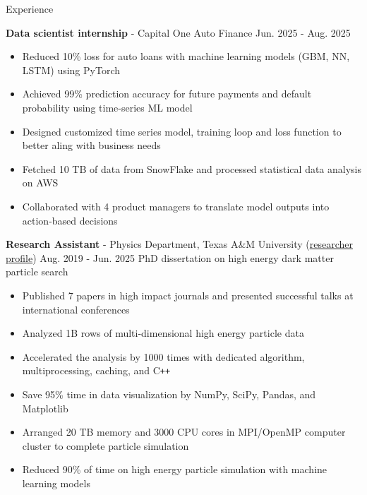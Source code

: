 \documentclass{resume}
\begin{document}
\begin{rSection}{Experience}
    \vspace{-1.5em}
    \item \textbf{Data scientist internship} - Capital One Auto Finance \hfill Jun. 2025 - Aug. 2025
        \begin{itemize}
        \item Reduced 10\% loss for auto loans with machine learning models (GBM, NN, LSTM) using PyTorch
        \item Achieved 99\% prediction accuracy for future payments and default probability using time-series ML model
        \item Designed customized time series model, training loop and loss function to better aling with business needs
        \item Fetched 10 TB of data from SnowFlake and processed statistical data analysis on AWS
        \item Collaborated with 4 product managers to translate model outputs into action-based decisions
        \end{itemize}

    \vspace{0.4em}
    \item \textbf{Research Assistant} - Physics Department, Texas A\&M University (\href{https://inspirehep.net/authors/2661451}{researcher profile}) \hfill Aug. 2019 - Jun. 2025
        \newline\hspace*{0.5em} {\normalsize PhD dissertation on high energy dark matter particle search}
        \begin{itemize}
        \item Published 7 papers in high impact journals and presented successful talks at international conferences
        \item Analyzed 1B rows of multi-dimensional high energy particle data
        \item Accelerated the analysis by 1000 times with dedicated algorithm, multiprocessing, caching, and C\texttt{++}
        \item Save 95\% time in data visualization by NumPy, SciPy, Pandas, and Matplotlib
        \item Arranged 20 TB memory and 3000 CPU cores in MPI/OpenMP computer cluster to complete particle simulation
        \item Reduced 90\% of time on high energy particle simulation with machine learning models
        \end{itemize}


\end{rSection}
\end{document}
